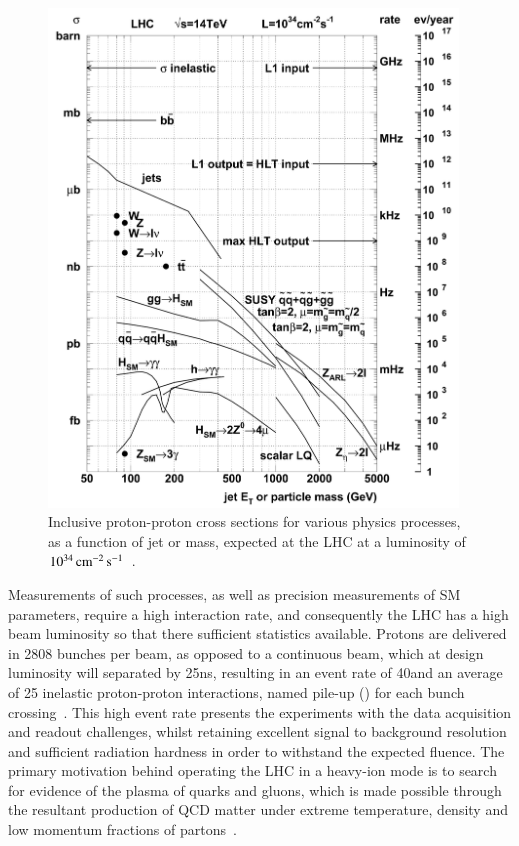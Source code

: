 \begin{figure}[htbp]
\begin{center}
\includegraphics[width=0.97\textwidth]{figs/cms/crossSections.pdf}
\caption{Inclusive proton-proton cross sections for various physics processes, as a function of jet \Et or mass, expected at the LHC at a luminosity of $10^{34}\,\text{cm}^\text{$-$2}\,\text{s}^\text{$-$1}$~\cite{Dasu:2000ge}.}
\label{fig:crossSections}
\end{center}
\end{figure}

Measurements of such processes, as well as precision measurements of SM parameters, require a high interaction rate, and consequently the LHC has a high beam luminosity so that there sufficient statistics available.
Protons are delivered in 2808 bunches per beam, as opposed to a continuous beam, which at design luminosity will separated by 25ns, resulting in an event rate of 40\MHz and an average of 25 inelastic proton-proton interactions, named pile-up (\PU) for each bunch crossing~\cite{Bruning:782076,Ball:2007zza}. 
This high event rate presents the experiments with the data acquisition and readout challenges, whilst retaining excellent signal to background resolution and sufficient radiation hardness in order to withstand the expected fluence.
The primary motivation behind operating the LHC in a heavy-ion mode is to search for evidence of the plasma of quarks and gluons, which is made possible through the resultant production of QCD matter under extreme temperature, density and low momentum fractions of partons~\cite{Baur:687318}.

